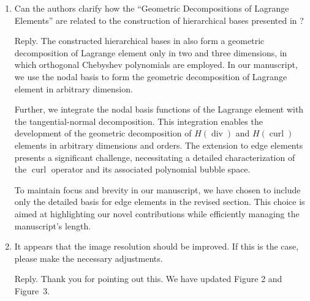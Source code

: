 \documentclass[10pt]{amsart}
\theoremstyle{definition}
\theoremstyle{remark}
\newcommand{\curl}{\operatorname{curl}}
\renewcommand{\div}{\operatorname{div}}
\begin{document}
\begin{enumerate}[1.]


\item \textsf{Can the authors clarify how the ``Geometric Decompositions of Lagrange Elements'' are related to the construction of hierarchical bases presented in \cite{DevlooBravoRylo2009}?}

\smallskip \noindent \textcolor[rgb]{1.00,0.00,0.00}{Reply.}
The constructed hierarchical bases in \cite{DevlooBravoRylo2009} also form a geometric decomposition of Lagrange element only in two and three dimensions, in which orthogonal Chebyshev polynomials are employed. In our manuscript, we use the nodal basis to form the geometric decomposition of Lagrange element in arbitrary dimension.

Further, we integrate the nodal basis functions of the Lagrange element with the tangential-normal decomposition. This integration enables the development of the geometric decomposition of $H(\div)$ and $H(\curl)$ elements in arbitrary dimensions and orders. The extension to edge elements presents a significant challenge, necessitating a detailed characterization of the $\curl$ operator and its associated polynomial bubble space.

To maintain focus and brevity in our manuscript, we have chosen to include only the detailed basis for edge elements in the revised section. This choice is aimed at highlighting our novel contributions while efficiently managing the manuscript's length.




\medskip

\item \textsf{It appears that the image resolution should be improved. If this is the case, please make the necessary adjustments.}

\smallskip \noindent \textcolor[rgb]{1.00,0.00,0.00}{Reply.}
Thank you for pointing out this. We have updated Figure 2 and Figure~3.


\end{enumerate}










\end{document}
